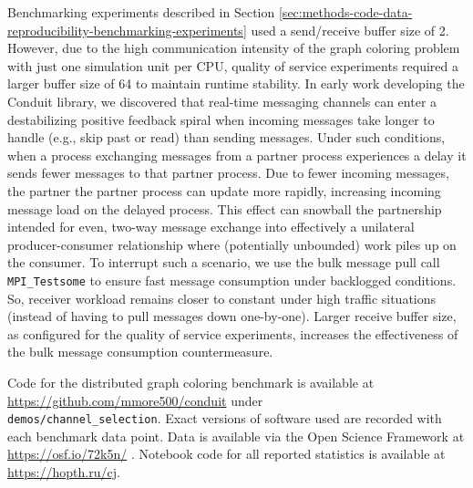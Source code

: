 Benchmarking experiments described in Section \ref{sec:methods-code-data-reproducibility-benchmarking-experiments} used a send/receive buffer size of 2.
However, due to the high communication intensity of the graph coloring problem with just one simulation unit per CPU, quality of service experiments required a larger buffer size of 64 to maintain runtime stability.
In early work developing the Conduit library, we discovered that real-time messaging channels can enter a destabilizing positive feedback spiral when incoming messages take longer to handle (e.g., skip past or read) than sending messages.
Under such conditions, when a process exchanging messages from a partner process experiences a delay it sends fewer messages to that partner process.
Due to fewer incoming messages, the partner the partner process can update more rapidly, increasing incoming message load on the delayed process.
This effect can snowball the partnership intended for even, two-way message exchange into effectively a unilateral producer-consumer relationship where (potentially unbounded) work piles up on the consumer.
To interrupt such a scenario, we use the bulk message pull call \verb|MPI_Testsome| to ensure fast message consumption under backlogged conditions.
So, receiver workload remains closer to constant under high traffic situations (instead of having to pull messages down one-by-one).
Larger receive buffer size, as configured for the quality of service experiments, increases the effectiveness of the bulk message consumption countermeasure.

Code for the distributed graph coloring benchmark is available at \url{https://github.com/mmore500/conduit} under \\ \texttt{demos/channel\_selection}.
Exact versions of software used are recorded with each benchmark data point.
Data is available via the Open Science Framework at \url{https://osf.io/72k5n/} \citep{foster2017open}.
Notebook code for all reported statistics is available at \url{https://hopth.ru/cj}.
